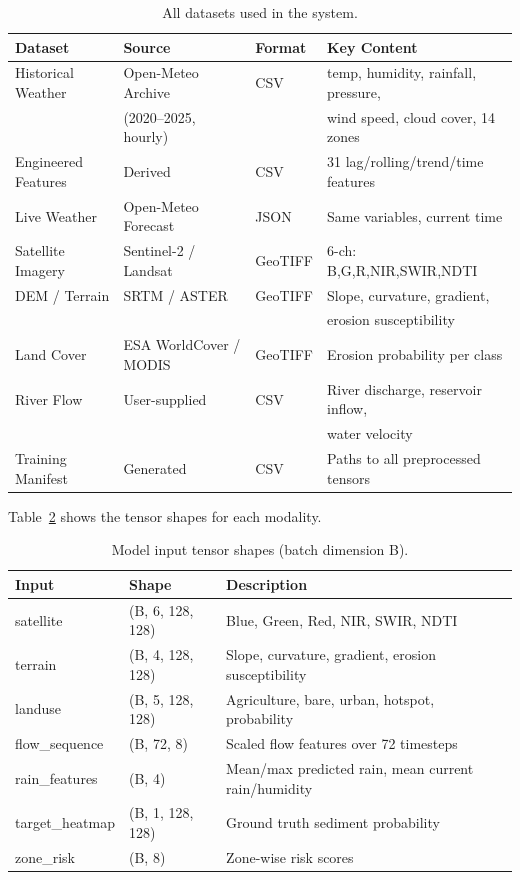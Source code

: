 \documentclass[twocolumn]{article}
\begin{document}
\begin{table}[H]
\centering
\small
\caption{All datasets used in the system.}
\label{tab:datasets}
\begin{tabular}{llll}
\toprule
Dataset & Source & Format & Key Content \\
\midrule
Historical Weather & Open-Meteo Archive & CSV & temp, humidity, rainfall, pressure, \\
& (2020--2025, hourly) & & wind speed, cloud cover, 14 zones \\
Engineered Features & Derived & CSV & 31 lag/rolling/trend/time features \\
Live Weather & Open-Meteo Forecast & JSON & Same variables, current time \\
Satellite Imagery & Sentinel-2 / Landsat & GeoTIFF & 6-ch: B,G,R,NIR,SWIR,NDTI \\
DEM / Terrain & SRTM / ASTER & GeoTIFF & Slope, curvature, gradient, \\
& & & erosion susceptibility \\
Land Cover & ESA WorldCover / MODIS & GeoTIFF & Erosion probability per class \\
River Flow & User-supplied & CSV & River discharge, reservoir inflow, \\
& & & water velocity \\
Training Manifest & Generated & CSV & Paths to all preprocessed tensors \\
\bottomrule
\end{tabular}
\end{table}

Table~\ref{tab:dimensions} shows the tensor shapes for each modality.

\begin{table}[H]
\centering
\small
\caption{Model input tensor shapes (batch dimension B).}
\label{tab:dimensions}
\begin{tabular}{lll}
\toprule
Input & Shape & Description \\
\midrule
satellite & (B, 6, 128, 128) & Blue, Green, Red, NIR, SWIR, NDTI \\
terrain & (B, 4, 128, 128) & Slope, curvature, gradient, erosion susceptibility \\
landuse & (B, 5, 128, 128) & Agriculture, bare, urban, hotspot, probability \\
flow\_sequence & (B, 72, 8) & Scaled flow features over 72 timesteps \\
rain\_features & (B, 4) & Mean/max predicted rain, mean current rain/humidity \\
target\_heatmap & (B, 1, 128, 128) & Ground truth sediment probability \\
zone\_risk & (B, 8) & Zone-wise risk scores \\
\bottomrule
\end{tabular}
\end{table}
\end{document}
